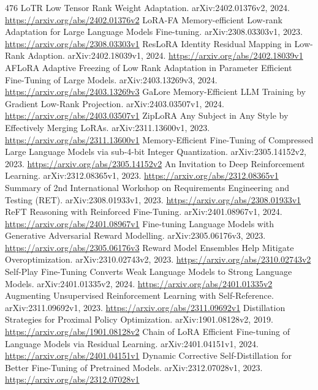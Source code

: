 \documentclass[11pt]{article}
\begin{document}
\begin{thebibliography}{476}
 LoTR Low Tensor Rank Weight Adaptation. arXiv:2402.01376v2, 2024. \url{https://arxiv.org/abs/2402.01376v2}
 LoRA-FA Memory-efficient Low-rank Adaptation for Large Language Models Fine-tuning. arXiv:2308.03303v1, 2023. \url{https://arxiv.org/abs/2308.03303v1}
 ResLoRA Identity Residual Mapping in Low-Rank Adaption. arXiv:2402.18039v1, 2024. \url{https://arxiv.org/abs/2402.18039v1}
 AFLoRA Adaptive Freezing of Low Rank Adaptation in Parameter Efficient Fine-Tuning of Large Models. arXiv:2403.13269v3, 2024. \url{https://arxiv.org/abs/2403.13269v3}
 GaLore Memory-Efficient LLM Training by Gradient Low-Rank Projection. arXiv:2403.03507v1, 2024. \url{https://arxiv.org/abs/2403.03507v1}
 ZipLoRA Any Subject in Any Style by Effectively Merging LoRAs. arXiv:2311.13600v1, 2023. \url{https://arxiv.org/abs/2311.13600v1}
 Memory-Efficient Fine-Tuning of Compressed Large Language Models via sub-4-bit Integer Quantization. arXiv:2305.14152v2, 2023. \url{https://arxiv.org/abs/2305.14152v2}
 An Invitation to Deep Reinforcement Learning. arXiv:2312.08365v1, 2023. \url{https://arxiv.org/abs/2312.08365v1}
 Summary of 2nd International Workshop on Requirements Engineering and Testing (RET). arXiv:2308.01933v1, 2023. \url{https://arxiv.org/abs/2308.01933v1}
 ReFT Reasoning with Reinforced Fine-Tuning. arXiv:2401.08967v1, 2024. \url{https://arxiv.org/abs/2401.08967v1}
 Fine-tuning Language Models with Generative Adversarial Reward Modelling. arXiv:2305.06176v3, 2023. \url{https://arxiv.org/abs/2305.06176v3}
 Reward Model Ensembles Help Mitigate Overoptimization. arXiv:2310.02743v2, 2023. \url{https://arxiv.org/abs/2310.02743v2}
 Self-Play Fine-Tuning Converts Weak Language Models to Strong Language Models. arXiv:2401.01335v2, 2024. \url{https://arxiv.org/abs/2401.01335v2}
 Augmenting Unsupervised Reinforcement Learning with Self-Reference. arXiv:2311.09692v1, 2023. \url{https://arxiv.org/abs/2311.09692v1}
 Distillation Strategies for Proximal Policy Optimization. arXiv:1901.08128v2, 2019. \url{https://arxiv.org/abs/1901.08128v2}
 Chain of LoRA Efficient Fine-tuning of Language Models via Residual Learning. arXiv:2401.04151v1, 2024. \url{https://arxiv.org/abs/2401.04151v1}
 Dynamic Corrective Self-Distillation for Better Fine-Tuning of Pretrained Models. arXiv:2312.07028v1, 2023. \url{https://arxiv.org/abs/2312.07028v1}

\end{thebibliography}
\end{document}
